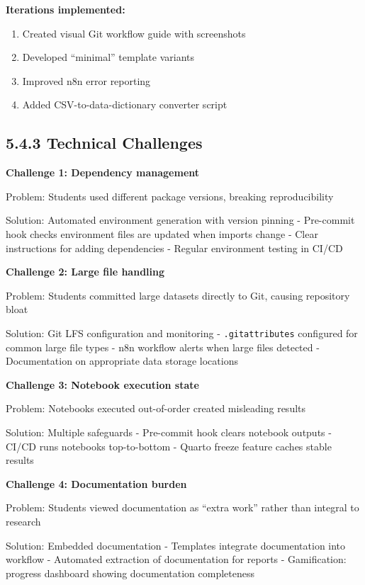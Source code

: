 \documentclass[
  oneside,
  open=any]{scrbook}
\providecommand{\tightlist}{%
  \setlength{\itemsep}{0pt}\setlength{\parskip}{0pt}}\usepackage{longtable,booktabs,array}
\begin{document}
\textbf{Iterations implemented:}

\begin{enumerate}
\def\labelenumi{\arabic{enumi}.}
\tightlist
\item
  Created visual Git workflow guide with screenshots
\item
  Developed ``minimal'' template variants
\item
  Improved n8n error reporting
\item
  Added CSV-to-data-dictionary converter script
\end{enumerate}

\subsection{5.4.3 Technical Challenges}\label{technical-challenges}

\textbf{Challenge 1: Dependency management}

Problem: Students used different package versions, breaking
reproducibility

Solution: Automated environment generation with version pinning -
Pre-commit hook checks environment files are updated when imports change
- Clear instructions for adding dependencies - Regular environment
testing in CI/CD

\textbf{Challenge 2: Large file handling}

Problem: Students committed large datasets directly to Git, causing
repository bloat

Solution: Git LFS configuration and monitoring - \texttt{.gitattributes}
configured for common large file types - n8n workflow alerts when large
files detected - Documentation on appropriate data storage locations

\textbf{Challenge 3: Notebook execution state}

Problem: Notebooks executed out-of-order created misleading results

Solution: Multiple safeguards - Pre-commit hook clears notebook outputs
- CI/CD runs notebooks top-to-bottom - Quarto freeze feature caches
stable results

\textbf{Challenge 4: Documentation burden}

Problem: Students viewed documentation as ``extra work'' rather than
integral to research

Solution: Embedded documentation - Templates integrate documentation
into workflow - Automated extraction of documentation for reports -
Gamification: progress dashboard showing documentation completeness
\end{document}

